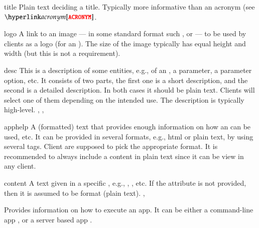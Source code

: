 \bigskip
\xmlstruct
{title}
{
%
  Plain text deciding a title. Typically more informative than an acronym (see 
  $\xmlstructref{acronym}$.
%
}
{}


\bigskip
\xmlstruct
{logo}
{
%
  A link to an image --- in some standard format such
  ,  or 
  --- to be used by clients as a logo (for an \app). The size of the
  image typically has equal height and width (but this is not a
  requirement).
%
}
{}


\bigskip
\xmlstruct
{desc}
{
%
  This is a description of some entities, e.g., of an \app, a
  parameter, a parameter option, etc. It consists of two parts, the
  first one is a short description, and the second is a detailed
  description. In both cases it should be plain text. Clients will
  select one of them depending on the intended use. The description is
  typically high-level.
%
}
{, , }


\bigskip
\xmlstruct
{apphelp}
{
%
  A (formatted) text that provides enough information on how an \app
  can be used, etc. It can be provided in several formats, e.g., html
  or plain text, by using several  tags. Client
  are supposed to pick the appropriate format. It is recommended to
  always include a content in plain text since it can be view in any
  client.
%
}
{}


\bigskip
\xmlstruct
{content}
{
%
  A text given in a specific , e.g.,
  , , etc. If the
  attribute  is not provided, then it is assumed
  to be  format (plain text).
%
}
{, }

\bigskip
{}
{
%
  Provides information on how to execute an app. It can be
  either a command-line app , or a
  server based app . 
%
}
{}

